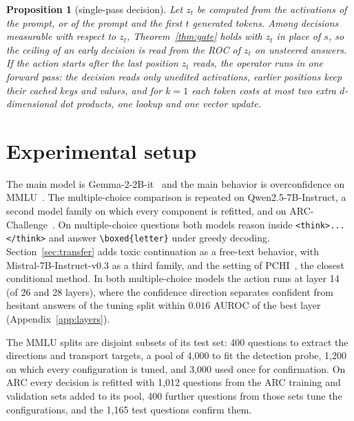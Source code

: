 \documentclass{article}
\newtheorem{proposition}{Proposition}
\begin{document}
\begin{proposition}[single-pass decision]
\label{prop:seq}
Let $z_t$ be computed from the activations of the prompt, or of the prompt and
the first $t$ generated tokens. Among decisions measurable with respect to
$z_t$, Theorem~\ref{thm:gate} holds with $z_t$ in place of $s$, so the ceiling
of an early decision is read from the ROC of $z_t$ on unsteered answers. If the
action starts after the last position $z_t$ reads, the operator runs in one
forward pass: the decision reads only unedited activations, earlier positions
keep their cached keys and values, and for $k=1$ each token costs at most two extra
$d$-dimensional dot products, one lookup and one vector update.
\end{proposition}
\section{Experimental setup}
\label{sec:exp}\label{sec:data}

The main model is Gemma-2-2B-it~\citep{gemma2024} and the main behavior is
overconfidence on MMLU~\citep{hendrycks2021mmlu}. The multiple-choice
comparison is repeated on Qwen2.5-7B-Instruct, a second model family on which
every component is refitted, and on ARC-Challenge~\citep{clark2018arc}. On
multiple-choice questions both models reason inside
\texttt{<think>...</think>} and answer \verb|\boxed{letter}| under greedy
decoding. Section~\ref{sec:transfer} adds toxic continuation as a
free-text behavior, with Mistral-7B-Instruct-v0.3 as a third family, and the
setting of PCHI~\citep{liu2026probe}, the closest conditional method. In both
multiple-choice models the action runs at layer 14 (of 26 and 28 layers),
where the confidence direction separates confident from hesitant answers of the
tuning split within $0.016$ AUROC of the best layer
(Appendix~\ref{app:layers}).

The MMLU splits are disjoint subsets of its test set: 400 questions to extract
the directions and transport targets, a pool of 4{,}000 to fit the detection
probe, 1{,}200 on which every configuration is tuned, and 3{,}000 used once for
confirmation. On ARC every decision is refitted with 1{,}012 questions from the
ARC training and validation sets added to its pool, 400 further questions from
those sets tune the configurations, and the 1{,}165 test questions confirm
them.
\end{document}
